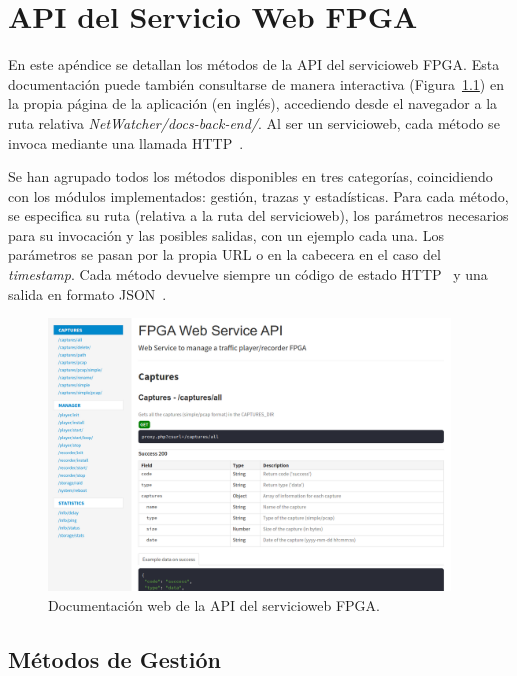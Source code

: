 \chapter{API del Servicio Web FPGA\label{extra:api_servicio_web_fpga}}

En este apéndice se detallan los métodos de la \gls{API} del \gls{servicioweb} \gls{FPGA}.
Esta documentación puede también consultarse de manera interactiva (Figura~\ref{fig:docsbackend}) en la propia página de la aplicación (en inglés), accediendo desde el navegador a la ruta relativa \textit{NetWatcher/docs-back-end/}.
Al ser un \gls{servicioweb}, cada método se invoca mediante una llamada \gls{HTTP}~\cite{httpmethods}.

Se han agrupado todos los métodos disponibles en tres categorías, coincidiendo con los módulos implementados: gestión, trazas y estadísticas.
Para cada método, se especifica su ruta (relativa a la ruta del \gls{servicioweb}), los parámetros necesarios para su invocación y las posibles salidas, con un ejemplo cada una.
Los parámetros se pasan por la propia \gls{URL} o en la cabecera en el caso del \textit{timestamp}.
Cada método devuelve siempre un código de estado \gls{HTTP}~\cite{httpcodes} y una salida en formato \gls{JSON}~\cite{json}.

\begin{figure}[!htp]
  \centering
  \includegraphics[width=0.95\textwidth,clip=true]{graphics/capturas/docs_backend}
  \caption{Documentación web de la \gls{API} del \gls{servicioweb} \gls{FPGA}.}
  \label{fig:docsbackend}
\end{figure}

\section{Métodos de Gestión\label{extra:api:gestion}}


